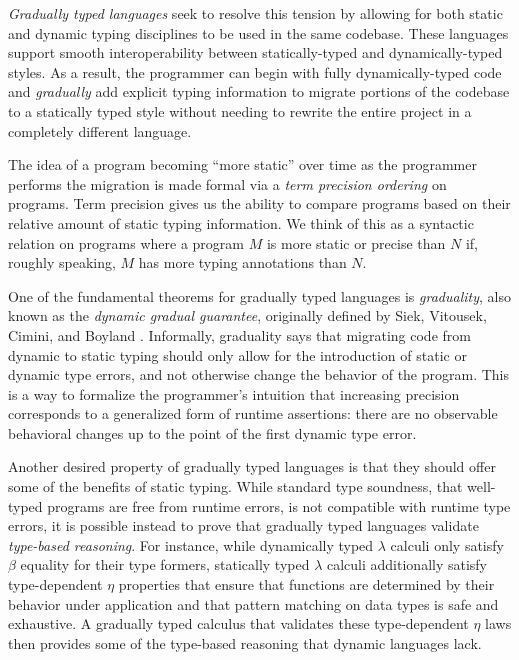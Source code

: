 \documentclass{article}
\theoremstyle{definition}
\theoremstyle{remark}
\begin{document}
\emph{Gradually typed languages} \cite{siek-taha06, tobin-hochstadt06} seek to
resolve this tension by allowing for both static and dynamic typing disciplines
to be used in the same codebase. These languages support smooth interoperability
between statically-typed and dynamically-typed styles. As a result, the programmer
can begin with fully dynamically-typed code and \emph{gradually} add explicit typing
information to migrate portions of the codebase to a statically typed style
without needing to rewrite the entire project in a completely different language.


The idea of a program becoming ``more static'' over time as the programmer
performs the migration is made formal via a \emph{term precision ordering} on
programs. Term precision gives us the ability to compare programs based on their
relative amount of static typing information. We think of this as a syntactic
relation on programs where a program $M$ is more static or precise than $N$ if,
roughly speaking, $M$ has more typing annotations than $N$.

One of the fundamental theorems for gradually typed languages is
\emph{graduality}, also known as the \emph{dynamic gradual guarantee},
originally defined by Siek, Vitousek, Cimini, and Boyland
\cite{siek_et_al:LIPIcs:2015:5031, new-ahmed2018}.
%
Informally, graduality says that migrating code from dynamic to static typing
should only allow for the introduction of static or dynamic type errors, and not
otherwise change the behavior of the program.
%
%
%
This is a way to formalize the programmer's intuition that increasing precision
corresponds to a generalized form of runtime assertions: there are no observable
behavioral changes up to the point of the first dynamic type error.
%

Another desired property of gradually typed languages is that they should offer
some of the benefits of static typing. While standard type soundness, that
well-typed programs are free from runtime errors, is not compatible with runtime
type errors, it is possible instead to prove that gradually typed languages
validate \emph{type-based reasoning}. For instance, while dynamically typed
$\lambda$ calculi only satisfy $\beta$ equality for their type formers,
statically typed $\lambda$ calculi additionally satisfy type-dependent $\eta$
properties that ensure that functions are determined by their behavior under
application and that pattern matching on data types is safe and exhaustive. A
gradually typed calculus that validates these type-dependent $\eta$ laws then
provides some of the type-based reasoning that dynamic languages lack.
\end{document}
